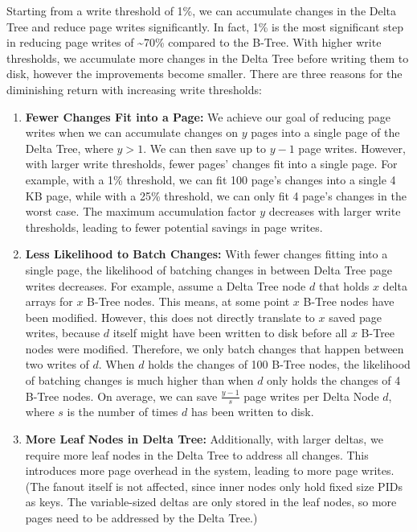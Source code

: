Starting from a write threshold of 1\%, we can accumulate changes in the Delta Tree and reduce page writes significantly.
In fact, 1\% is the most significant step in reducing page writes of \textasciitilde70\% compared to the B-Tree.
With higher write thresholds, we accumulate more changes in the Delta Tree before writing them to disk, however the improvements become smaller.
There are three reasons for the diminishing return with increasing write thresholds:
\begin{enumerate}
\item \textbf{Fewer Changes Fit into a Page:} 
We achieve our goal of reducing page writes when we can accumulate changes on $y$ pages into a single page of the Delta Tree, where $y > 1$.
We can then save up to $y - 1$ page writes.
However, with larger write thresholds, fewer pages' changes fit into a single page.
For example, with a 1\% threshold, we can fit 100 page's changes into a single 4 KB page, while with a 25\% threshold, we can only fit 4 page's changes in the worst case.
The maximum accumulation factor $y$ decreases with larger write thresholds, leading to fewer potential savings in page writes.
\item \textbf{Less Likelihood to Batch Changes:}
With fewer changes fitting into a single page, the likelihood of batching changes in between Delta Tree page writes decreases.
For example, assume a Delta Tree node $d$ that holds $x$ delta arrays for $x$ B-Tree nodes.
This means, at some point $x$ B-Tree nodes have been modified. 
However, this does not directly translate to $x$ saved page writes, because $d$ itself might have been written to disk before all $x$ B-Tree nodes were modified.
Therefore, we only batch changes that happen between two writes of $d$.
When $d$ holds the changes of 100 B-Tree nodes, the likelihood of batching changes is much higher than when $d$ only holds the changes of 4 B-Tree nodes.
On average, we can save $\frac{y - 1}{s}$ page writes per Delta Node $d$, where $s$ is the number of times $d$ has been written to disk.
\item \textbf{More Leaf Nodes in Delta Tree:}
Additionally, with larger deltas, we require more leaf nodes in the Delta Tree to address all changes.
This introduces more page overhead in the system, leading to more page writes.
(The fanout itself is not affected, since inner nodes only hold fixed size \ac{PID}s as keys. The variable-sized deltas are only stored in the leaf nodes, so more pages need to be addressed by the Delta Tree.)
\end{enumerate}

